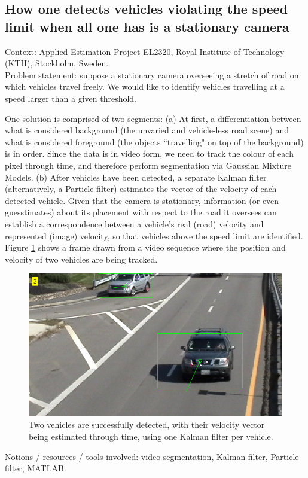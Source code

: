 \subsection{How one detects vehicles violating the speed limit when
all one has is a stationary camera}

Context: Applied Estimation Project EL2320, Royal Institute of Technology (KTH),
Stockholm, Sweden.\\

Problem statement: suppose a stationary camera overseeing a stretch of road on
which vehicles travel freely. We would like to identify vehicles travelling at
a speed larger than a given threshold.

One solution is comprised of two segments: (a) At first, a differentiation
between what is considered background (the unvaried and vehicle-less road scene)
and what is considered foreground (the objects ``travelling" on top of the
background) is in order. Since the data is in video form, we need to track
the colour of each pixel through time, and therefore perform segmentation via
Gaussian Mixture Models. (b) After vehicles have been detected, a separate
Kalman filter (alternatively, a Particle filter) estimates the vector of the
velocity of each detected vehicle. Given that the camera is stationary,
information (or even guesstimates) about its placement with respect to the
road it oversees can establish a correspondence between a vehicle's real (road)
velocity and represented (image) velocity, so that vehicles above the speed
limit are identified. Figure \ref{fig:kf_1} shows a frame drawn from a video
sequence where the position and velocity of two vehicles are being tracked.

\begin{figure}[H]\centering
  \includegraphics[scale=0.55]{images/kf_1.png}
  \caption{Two vehicles are successfully detected, with their velocity vector
    being estimated through time, using one Kalman filter per vehicle.}
  \label{fig:kf_1}
\end{figure}

Notions / resources / tools involved: video segmentation, Kalman filter,
Particle filter, MATLAB.
